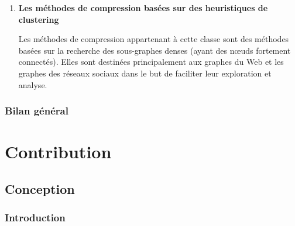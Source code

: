 \documentclass[a4paper,oneside,12pt]{report}
\theoremstyle{definition}
\begin{document}
\begin{enumerate}[label=\alph*.]
\begin{enumerate}[label*=\arabic*.]
								
								
								
							
								
							\item \textbf{Les méthodes de compression basées sur des heuristiques de clustering} 				
							
							Les méthodes de compression appartenant à cette classe sont des méthodes basées sur la recherche des sous-graphes denses (ayant des nœuds fortement connectés). Elles sont destinées principalement aux graphes du Web et les graphes des réseaux sociaux dans le but de faciliter leur exploration et analyse.
								
								
										
						
						\end{enumerate}	
					
					\end{enumerate}
						
												
								
		\section{Bilan général}
	


	
	
	


	
	


\part{Contribution}

%

\chapter{Conception}
	\section{Introduction}
	
\end{document}
